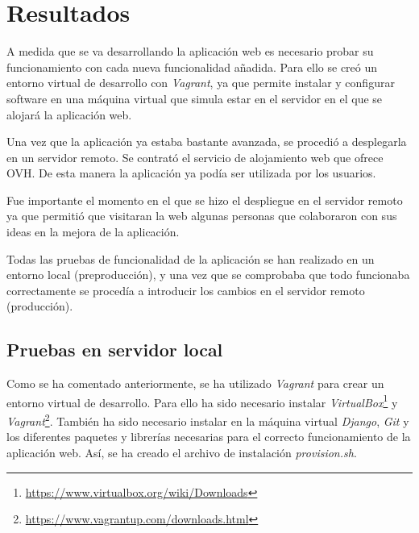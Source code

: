 \documentclass[a4paper, 12pt]{book}
\begin{document}

\cleardoublepage
\chapter{Resultados}

A medida que se va desarrollando la aplicación web es necesario probar su funcionamiento con cada nueva funcionalidad añadida. Para ello se creó un entorno virtual de desarrollo con \textit{Vagrant}, ya que permite instalar y configurar software en una máquina virtual que simula estar en el servidor en el que se alojará la aplicación web.
\newline

Una vez que la aplicación ya estaba bastante avanzada, se procedió a desplegarla en un servidor remoto. Se contrató el servicio de alojamiento web que ofrece OVH. De esta manera la aplicación ya podía ser utilizada por los usuarios.
\newline

Fue importante el momento en el que se hizo el despliegue en el servidor remoto ya que permitió que visitaran la web algunas personas que colaboraron con sus ideas en la mejora de la aplicación. 
\newline

Todas las pruebas de funcionalidad de la aplicación se han realizado en un entorno local (preproducción), y una vez que se comprobaba que todo funcionaba correctamente se procedía a introducir los cambios en el servidor remoto (producción).


\section{Pruebas en servidor local} 
\label{sec:pruebas-en-servidor-local}

Como se ha comentado anteriormente, se ha utilizado \textit{Vagrant} para crear un entorno virtual de desarrollo. Para ello ha sido necesario instalar \textit{VirtualBox}\footnote{\url{https://www.virtualbox.org/wiki/Downloads}} y \textit{Vagrant}\footnote{\url{https://www.vagrantup.com/downloads.html}}. También ha sido necesario instalar en la máquina virtual\textit{ Django}, \textit{Git} y los diferentes paquetes y librerías necesarias para el correcto funcionamiento de la aplicación web. Así, se ha creado el archivo de instalación \textit{provision.sh}.
\newline
\end{document}
